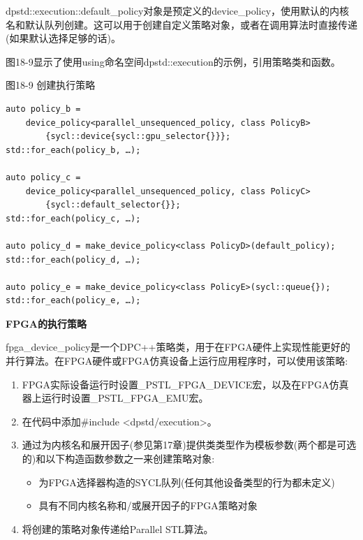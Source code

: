 dpstd::execution::default\_policy对象是预定义的device\_policy，使用默认的内核名和默认队列创建。这可以用于创建自定义策略对象，或者在调用算法时直接传递(如果默认选择足够的话)。\par

图18-9显示了使用using命名空间dpstd::execution的示例，引用策略类和函数。\par

\hspace*{\fill} \par %
图18-9 创建执行策略
\begin{lstlisting}[caption={}]
auto policy_b = 
	device_policy<parallel_unsequenced_policy, class PolicyB> 
		{sycl::device{sycl::gpu_selector{}}};
std::for_each(policy_b, …);

auto policy_c = 
	device_policy<parallel_unsequenced_policy, class PolicyС> 
		{sycl::default_selector{}};
std::for_each(policy_c, …);

auto policy_d = make_device_policy<class PolicyD>(default_policy);
std::for_each(policy_d, …);

auto policy_e = make_device_policy<class PolicyE>(sycl::queue{});
std::for_each(policy_e, …);
\end{lstlisting}

\hspace*{\fill} \par %
\textbf{FPGA的执行策略}

fpga\_device\_policy是一个DPC++策略类，用于在FPGA硬件上实现性能更好的并行算法。在FPGA硬件或FPGA仿真设备上运行应用程序时，可以使用该策略:\par

\begin{enumerate}
	\item FPGA实际设备运行时设置\_PSTL\_FPGA\_DEVICE宏，以及在FPGA仿真器上运行时设置\_PSTL\_FPGA\_EMU宏。
	\item 在代码中添加\#include <dpstd/execution>。
	\item 通过为内核名和展开因子(参见第17章)提供类类型作为模板参数(两个都是可选的)和以下构造函数参数之一来创建策略对象:
	\begin{itemize}
		\item 为FPGA选择器构造的SYCL队列(任何其他设备类型的行为都未定义)
		\item 具有不同内核名称和/或展开因子的FPGA策略对象
	\end{itemize}
	\item 将创建的策略对象传递给Parallel STL算法。
\end{enumerate}

